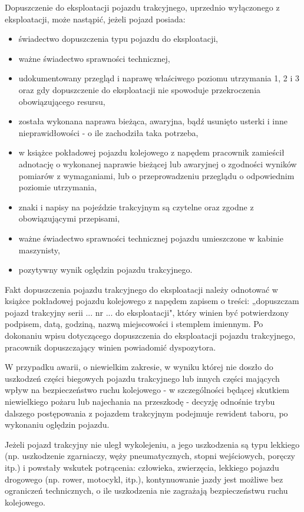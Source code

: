 Dopuszczenie do eksploatacji pojazdu trakcyjnego, uprzednio wyłączonego z eksploatacji, może nastąpić, jeżeli pojazd posiada:
\begin{itemize}
	\item świadectwo dopuszczenia typu pojazdu do eksploatacji,
	\item ważne świadectwo sprawności technicznej,
	\item udokumentowany przegląd i naprawę właściwego poziomu utrzymania 1, 2 i 3 oraz gdy dopuszczenie do eksploatacji nie spowoduje przekroczenia obowiązującego resursu,
	\item została wykonana naprawa bieżąca, awaryjna, bądź usunięto usterki i inne nieprawidłowości - o ile zachodziła taka potrzeba,
	\item w książce pokładowej pojazdu kolejowego z napędem pracownik zamieścił adnotację o wykonanej naprawie bieżącej lub awaryjnej o zgodności wyników pomiarów z wymaganiami, lub o przeprowadzeniu przeglądu o odpowiednim poziomie utrzymania,
	\item znaki i napisy na pojeździe trakcyjnym są czytelne oraz zgodne z obowiązującymi przepisami, 
	\item ważne świadectwo sprawności technicznej pojazdu umieszczone w kabinie maszynisty,
	\item pozytywny wynik oględzin pojazdu trakcyjnego.
\end{itemize}
Fakt dopuszczenia pojazdu trakcyjnego do eksploatacji należy odnotować w książce pokładowej pojazdu kolejowego z napędem zapisem o treści:
„dopuszczam pojazd trakcyjny serii ... nr ... do eksploatacji", który winien być potwierdzony podpisem, datą, godziną, nazwą miejscowości i stemplem imiennym. Po dokonaniu wpisu dotyczącego dopuszczenia do eksploatacji pojazdu trakcyjnego, pracownik dopuszczający winien powiadomić dyspozytora.

W przypadku awarii, o niewielkim zakresie, w wyniku której nie doszło do uszkodzeń części biegowych pojazdu trakcyjnego lub innych części mających
wpływ na bezpieczeństwo ruchu kolejowego - w szczególności będącej skutkiem niewielkiego pożaru lub najechania na przeszkodę - decyzję odnośnie trybu dalszego postępowania z pojazdem trakcyjnym podejmuje rewident taboru, po wykonaniu oględzin pojazdu.

Jeżeli pojazd trakcyjny nie uległ wykolejeniu, a jego uszkodzenia są typu lekkiego (np. uszkodzenie zgarniaczy, węży pneumatycznych, stopni wejściowych, poręczy itp.) i powstały wskutek potrącenia: człowieka, zwierzęcia, lekkiego pojazdu drogowego (np. rower, motocykl, itp.),  kontynuowanie jazdy jest możliwe bez ograniczeń technicznych, o ile uszkodzenia nie zagrażają bezpieczeństwu ruchu kolejowego.

